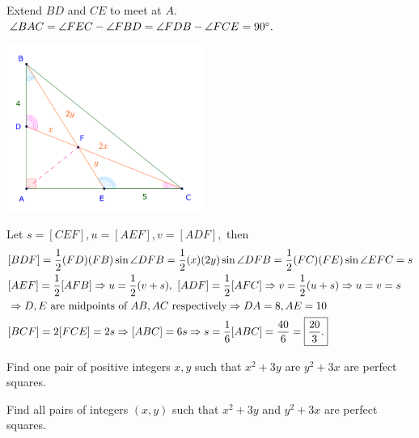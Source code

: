 \documentclass{article}
\begin{document}
\begin{soln}
    Extend $BD$ and $CE$ to meet at $A.$ $\angle BAC = \angle FEC - \angle FBD = \angle FDB - \angle FCE = 90^\circ.$
    \begin{center}
        \includegraphics[width=6.5cm]{./svg/pdf/23-24-sm2-s4-ct-p3.pdf}
    \end{center}
    
    Let $s = [CEF], u = [AEF], v = [ADF],$ then
    \[
        \begin{aligned}
            &[BDF] = \half (FD)(FB) \sin{\angle DFB} = \half (x)(2y) \sin{\angle DFB} = \half (FC)(FE) \sin{\angle EFC} = s\\
            &[AEF] = \half [AFB] \Rightarrow u = \half(v + s),\ [ADF] = \half [AFC] \Rightarrow v = \half(u + s) \Rightarrow u=v=s\\
            &\Rightarrow D, E \text{\ are midpoints of\ } AB, AC \text{\ respectively} \Rightarrow DA = 8, AE = 10\\
            &[BCF] = 2 [FCE] = 2s \Rightarrow [ABC] = 6s \Rightarrow s = \frac{1}{6} [ABC] = \frac{40}{6} = \boxed{\frac{20}{3}.}
        \end{aligned}
    \]
\end{soln}

\begin{problem}
    Find one pair of positive integers $x, y$  such that $x^2 + 3y$ are $y^2 + 3x$ are perfect squares.

    Find all pairs of integers $(x, y)$ such that $x^2 + 3y$ and $y^2 + 3x$ are perfect squares.
\end{problem}
\end{document}
